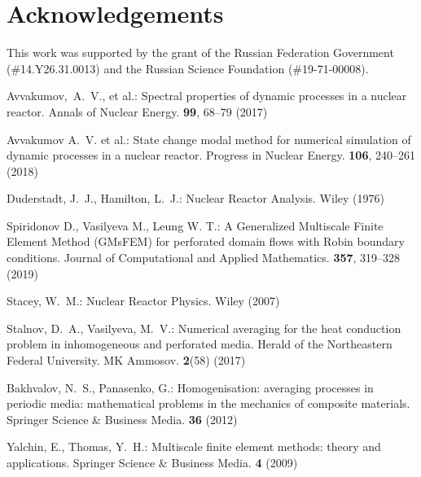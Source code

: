 \documentclass[runningheads]{llncs}
\begin{document}
\section*{Acknowledgements}
This work was supported by the grant of the Russian Federation Government
(\#14.Y26.31.0013) and the Russian Science Foundation (\#19-71-00008).

\begin{thebibliography}{8}

Avvakumov,~A.~V., et al.: Spectral properties of dynamic processes in a nuclear reactor. Annals of Nuclear Energy. \textbf{99}, 68--79 (2017) 

Avvakumov A.~V. et al.: State change modal method for numerical simulation of dynamic processes in a nuclear reactor. Progress in Nuclear Energy. \textbf{106}, 240--261 (2018)

Duderstadt, J.~J., Hamilton, L.~J.: Nuclear Reactor Analysis. Wiley (1976)

Spiridonov D., Vasilyeva M., Leung W. T.: A Generalized Multiscale Finite Element Method (GMsFEM) for perforated domain flows with Robin boundary conditions. Journal of Computational and Applied Mathematics. \textbf{357}, 319--328 (2019)

Stacey, W.~M.: Nuclear Reactor Physics. Wiley (2007)

Stalnov, D.~A., Vasilyeva, M.~V.: Numerical averaging for the heat conduction problem in inhomogeneous and perforated media. Herald of the Northeastern Federal University. MK Ammosov. \textbf{2}(58) (2017)

Bakhvalov, N.~S., Panasenko,  G.: Homogenisation: averaging processes in periodic media: mathematical problems in the mechanics of composite materials. Springer Science
\& Business Media.  \textbf{36} (2012)

Yalchin, E., Thomas, Y.~H.: Multiscale finite element methods: theory and applications.
Springer Science \& Business Media. \textbf{4} (2009)

\end{thebibliography}
\end{document}
